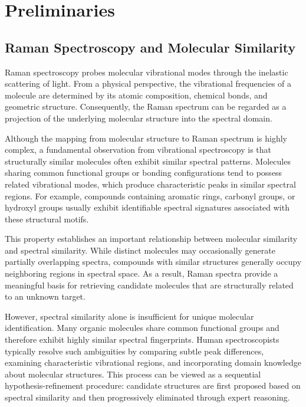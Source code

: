 \documentclass[conference]{IEEEtran}
\begin{document}
\section{Preliminaries}

\subsection{Raman Spectroscopy and Molecular Similarity}

Raman spectroscopy probes molecular vibrational modes through the inelastic scattering of light. From a physical perspective, the vibrational frequencies of a molecule are determined by its atomic composition, chemical bonds, and geometric structure. Consequently, the Raman spectrum can be regarded as a projection of the underlying molecular structure into the spectral domain.

Although the mapping from molecular structure to Raman spectrum is highly complex, a fundamental observation from vibrational spectroscopy is that structurally similar molecules often exhibit similar spectral patterns. Molecules sharing common functional groups or bonding configurations tend to possess related vibrational modes, which produce characteristic peaks in similar spectral regions. For example, compounds containing aromatic rings, carbonyl groups, or hydroxyl groups usually exhibit identifiable spectral signatures associated with these structural motifs.

This property establishes an important relationship between molecular similarity and spectral similarity. While distinct molecules may occasionally generate partially overlapping spectra, compounds with similar structures generally occupy neighboring regions in spectral space. As a result, Raman spectra provide a meaningful basis for retrieving candidate molecules that are structurally related to an unknown target.

However, spectral similarity alone is insufficient for unique molecular identification. Many organic molecules share common functional groups and therefore exhibit highly similar spectral fingerprints. Human spectroscopists typically resolve such ambiguities by comparing subtle peak differences, examining characteristic vibrational regions, and incorporating domain knowledge about molecular structures. This process can be viewed as a sequential hypothesis-refinement procedure: candidate structures are first proposed based on spectral similarity and then progressively eliminated through expert reasoning.
\end{document}
